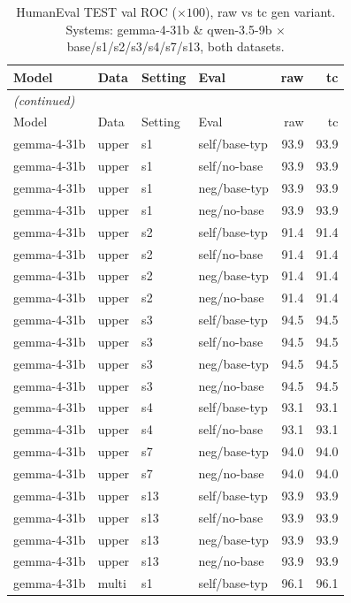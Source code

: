 {\small
\begin{longtable}{llll rr}
\caption{HumanEval TEST val ROC ($\times100$), raw vs tc gen variant. Systems: gemma-4-31b \& qwen-3.5-9b $\times$ base/s1/s2/s3/s4/s7/s13, both datasets.}\label{tab:he_test_val_roc}\\
\toprule
Model & Data & Setting & Eval & raw & tc \\
\midrule
\endfirsthead
\multicolumn{6}{l}{\itshape (continued)}\\
\toprule
Model & Data & Setting & Eval & raw & tc \\
\midrule
\endhead
\bottomrule
\endfoot
gemma-4-31b & upper & s1 & self/base-typ & 93.9 & 93.9 \\
gemma-4-31b & upper & s1 & self/no-base & 93.9 & 93.9 \\
gemma-4-31b & upper & s1 & neg/base-typ & 93.9 & 93.9 \\
gemma-4-31b & upper & s1 & neg/no-base & 93.9 & 93.9 \\
gemma-4-31b & upper & s2 & self/base-typ & 91.4 & 91.4 \\
gemma-4-31b & upper & s2 & self/no-base & 91.4 & 91.4 \\
gemma-4-31b & upper & s2 & neg/base-typ & 91.4 & 91.4 \\
gemma-4-31b & upper & s2 & neg/no-base & 91.4 & 91.4 \\
gemma-4-31b & upper & s3 & self/base-typ & 94.5 & 94.5 \\
gemma-4-31b & upper & s3 & self/no-base & 94.5 & 94.5 \\
gemma-4-31b & upper & s3 & neg/base-typ & 94.5 & 94.5 \\
gemma-4-31b & upper & s3 & neg/no-base & 94.5 & 94.5 \\
gemma-4-31b & upper & s4 & self/base-typ & 93.1 & 93.1 \\
gemma-4-31b & upper & s4 & self/no-base & 93.1 & 93.1 \\
gemma-4-31b & upper & s7 & neg/base-typ & 94.0 & 94.0 \\
gemma-4-31b & upper & s7 & neg/no-base & 94.0 & 94.0 \\
gemma-4-31b & upper & s13 & self/base-typ & 93.9 & 93.9 \\
gemma-4-31b & upper & s13 & self/no-base & 93.9 & 93.9 \\
gemma-4-31b & upper & s13 & neg/base-typ & 93.9 & 93.9 \\
gemma-4-31b & upper & s13 & neg/no-base & 93.9 & 93.9 \\
\midrule
gemma-4-31b & multi & s1 & self/base-typ & 96.1 & 96.1 \\

\end{longtable}}
